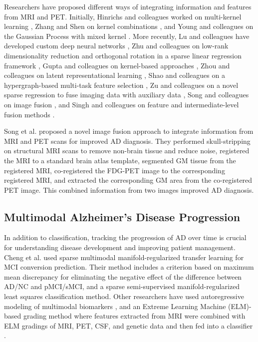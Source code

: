 Researchers have proposed different ways of integrating information and features from MRI and PET. Initially, Hinrichs and colleagues worked on multi-kernel learning \cite{hinrichs_predictive_2011}, Zhang and Shen on kernel combinations \cite{zhang_multi-modal_2012}, and Young and colleagues on the Gaussian Process with mixed kernel \cite{young_accurate_2013}. More recently, Lu and colleagues have developed custom deep neural networks \cite{lu_multimodal_2018}, Zhu and colleagues on low-rank dimensionality reduction and orthogonal rotation in a sparse linear regression framework \cite{zhu_low-rank_2019}, Gupta and colleagues on kernel-based approaches \cite{gupta_prediction_2019}, Zhou and colleagues on latent representational learning \cite{zhou_latent_2019}, Shao and colleagues on a hypergraph-based multi-task feature selection \cite{shao_hypergraph_2020},\cite{zu_label-aligned_2016} Zu and colleagues on a novel sparse regression to fuse imaging data with auxiliary data \cite{shen_heterogeneous_2021}, Song and colleagues on image fusion \cite{song_effective_2021}, and Singh and colleagues on feature and intermediate-level fusion methods \cite{singh_multi-modal_2023}.

Song et al. \cite{song_effective_2021} proposed a novel image fusion approach to integrate information from MRI and PET scans for improved AD diagnosis. They performed skull-stripping on structural MRI scans to remove non-brain tissue and reduce noise, registered the MRI to a standard brain atlas template, segmented GM tissue from the registered MRI, co-registered the FDG-PET image to the corresponding registered MRI, and extracted the corresponding GM area from the co-registered PET image. This combined information from two images improved AD diagnosis.

\subsection{Multimodal Alzheimer's Disease Progression}
In addition to classification, tracking the progression of AD over time is crucial for understanding disease development and improving patient management. Cheng et al. \cite{cheng_multimodal_2015} used sparse multimodal manifold-regularized transfer learning for MCI conversion prediction. Their method includes a criterion based on maximum mean discrepancy for eliminating the negative effect of the difference between AD/NC and pMCI/sMCI, and a sparse semi-supervised manifold-regularized least squares classification method. Other researchers have used autoregressive modeling of multimodal biomarkers \cite{minhas_predicting_2018}, and an Extreme Learning Machine (ELM)-based grading method where features extracted from MRI were combined with ELM gradings of MRI, PET, CSF, and genetic data and then fed into a classifier \cite{lin_predicting_2020}.

